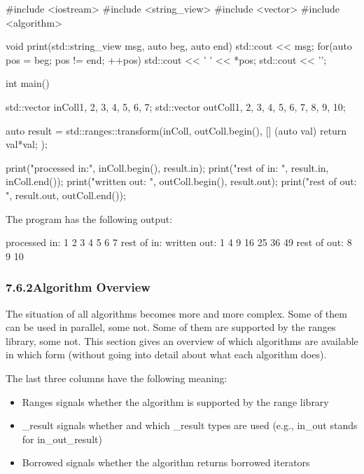 \begin{cpp}
#include <iostream>
#include <string_view>
#include <vector>
#include <algorithm>

void print(std::string_view msg, auto beg, auto end)
{
	std::cout << msg;
	for(auto pos = beg; pos != end; ++pos) {
		std::cout << ' ' << *pos;
	}
	std::cout << '\n';
}

int main()
{
	std::vector inColl{1, 2, 3, 4, 5, 6, 7};
	std::vector outColl{1, 2, 3, 4, 5, 6, 7, 8, 9, 10};
	
	auto result = std::ranges::transform(inColl, outColl.begin(),
	[] (auto val) {
		return val*val;
	});
	
	print("processed in:", inColl.begin(), result.in);
	print("rest of in: ", result.in, inColl.end());
	print("written out: ", outColl.begin(), result.out);
	print("rest of out: ", result.out, outColl.end());
}
\end{cpp}

The program has the following output:

{\footnotesize
\begin{shell}
processed in: 1 2 3 4 5 6 7
rest of in:
written out: 1 4 9 16 25 36 49
rest of out: 8 9 10
\end{shell}
}

\subsubsection*{ 7.6.2\hspace{0.2cm}Algorithm Overview}

The situation of all algorithms becomes more and more complex. Some of them can be used in parallel, some not. Some of them are supported by the ranges library, some not. This section gives an overview of which algorithms are available in which form (without going into detail about what each algorithm does).

The last three columns have the following meaning:

\begin{itemize}
\item
Ranges signals whether the algorithm is supported by the range library

\item
\_result signals whether and which \_result types are used (e.g., in\_out stands for in\_out\_result)

\item
Borrowed signals whether the algorithm returns borrowed iterators
\end{itemize}

